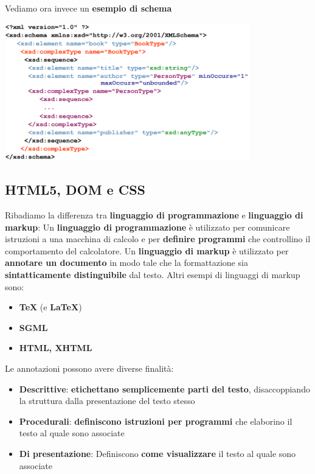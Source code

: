\documentclass[12pt]{article}
\begin{document}
Vediamo ora invece un \textbf{esempio di schema}
\begin{center}
    \includegraphics[width = 0.80\textwidth]{Images/151.PNG}
\end{center}
\subsection{HTML5, DOM e CSS}
Ribadiamo la differenza tra \textbf{linguaggio di programmazione} e \textbf{linguaggio di markup}: \newline
Un \textbf{linguaggio di programmazione} è utilizzato per comunicare istruzioni a una macchina di calcolo e per \textbf{definire programmi} che controllino il comportamento del calcolatore. \newline
Un \textbf{linguaggio di markup} è utilizzato per \textbf{annotare un documento} in modo tale che la formattazione sia \textbf{sintatticamente distinguibile} dal testo. Altri esempi di linguaggi di markup sono:
\begin{itemize}
    \item \textbf{TeX} (e \textbf{LaTeX})
    \item \textbf{SGML}
    \item \textbf{HTML, XHTML}
\end{itemize}
Le annotazioni possono avere diverse finalità:
\begin{itemize}
    \item \textbf{Descrittive}: \textbf{etichettano semplicemente parti del testo}, disaccoppiando la struttura dalla presentazione del testo stesso
    \item \textbf{Procedurali}: \textbf{definiscono istruzioni per programmi} che elaborino il testo al quale sono associate
    \item \textbf{Di presentazione}: Definiscono \textbf{come visualizzare} il testo al quale sono associate
\end{itemize}
\end{document}
